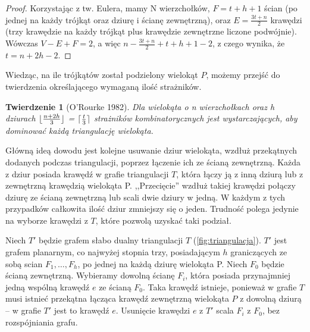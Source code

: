 \documentclass[brudnopis]{xmgr}
\DeclarePairedDelimiter\ceil{\lceil}{\rceil}
\DeclarePairedDelimiter\floor{\lfloor}{\rfloor}
\newtheorem{Twierdzenie}{Twierdzenie} \theoremstyle{definition}
\begin{document}
\begin{proof}
	Korzystając z tw. Eulera, mamy N wierzchołków, $F = t + h + 1$ ścian (po jednej na każdy trójkąt oraz dziurę i ścianę zewnętrzną), oraz $E = \frac{3t+n}{2}$ krawędzi (trzy krawędzie na każdy trójkąt plus krawędzie zewnętrzne liczone podwójnie).  Wówczas $V - E + F = 2$, a więc $n - \frac{3t+n}{2} + t + h + 1 - 2$, z czego wynika, że $t = n + 2h - 2$.
\end{proof}
Wiedząc, na ile trójkątów został podzielony wielokąt $P$, możemy przejść do twierdzenia określającego wymaganą ilość strażników.

\begin{Twierdzenie}[O'Rourke 1982]
  Dla wielokąta o n wierzchołkach oraz h dziurach $\floor{\frac{n+2h}{3}}$ = $\ceil{\frac{t}{3}}$ strażników kombinatorycznych jest wystarczających, aby dominować każdą triangulację wielokąta.
\end{Twierdzenie}

\indent Główną ideą dowodu jest kolejne usuwanie dziur wielokąta, wzdłuż przekątnych dodanych podczas triangulacji, poprzez łączenie ich ze ścianą zewnętrzną. Każda z dziur posiada krawędź w grafie triangulacji $T$, która łączy ją z inną dziurą lub z zewnętrzną krawędzią wielokąta P. ,,Przecięcie'' wzdłuż takiej krawędzi połączy dziurę ze ścianą zewnętrzną lub scali dwie dziury w jedną. W każdym z tych przypadków całkowita ilość dziur zmniejszy się o jeden. Trudność polega jedynie na wyborze krawędzi z $T$, które pozwolą uzyskać taki podział.

\indent Niech $T'$ będzie grafem słabo dualny triangulacji $T$ (\ref{fig:triangulacja}). $T'$ jest grafem planarnym, co najwyżej stopnia trzy, posiadającym $h$ graniczących ze sobą scian $F_1, \ldots, F_h$, po jednej na każdą dziurę wielokąta P. Niech $F_0$ będzie ścianą zewnętrzną. Wybieramy dowolną ścianę $F_i$, która posiada przynajmniej jedną wspólną krawędź $e$ ze ścianą $F_0$. Taka krawędź istnieje, ponieważ w grafie $T$ musi istnieć przekątna łącząca krawędź zewnętrzną wielokąta $P$ z dowolną dziurą -- w grafie $T'$ jest to krawędź $e$. Usunięcie krawędzi $e$ z $T'$ scala $F_i$ z $F_0$, bez rozspójniania grafu.
\end{document}
